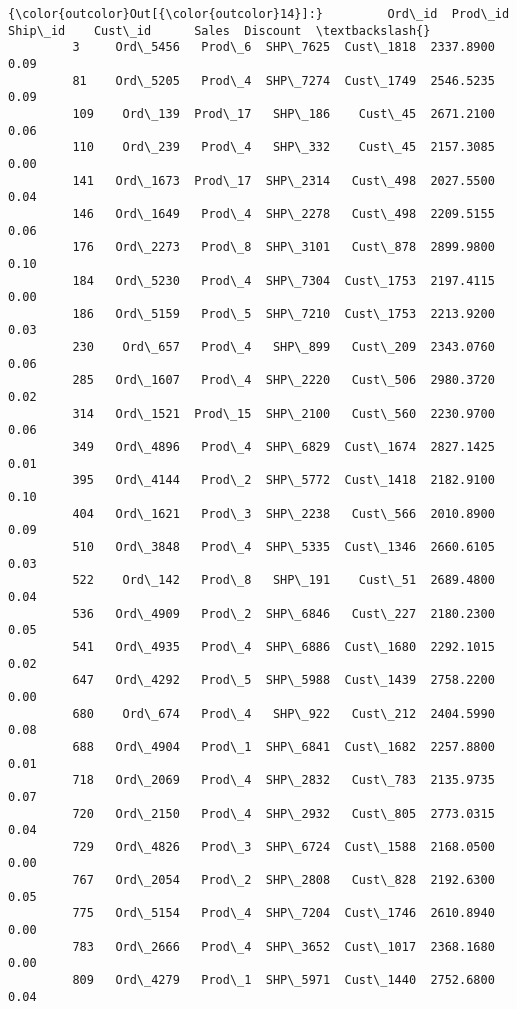 \documentclass[11pt]{article}
\begin{document}
\begin{Verbatim}[commandchars=\\\{\}]
{\color{outcolor}Out[{\color{outcolor}14}]:}         Ord\_id  Prod\_id   Ship\_id    Cust\_id      Sales  Discount  \textbackslash{}
         3     Ord\_5456   Prod\_6  SHP\_7625  Cust\_1818  2337.8900      0.09   
         81    Ord\_5205   Prod\_4  SHP\_7274  Cust\_1749  2546.5235      0.09   
         109    Ord\_139  Prod\_17   SHP\_186    Cust\_45  2671.2100      0.06   
         110    Ord\_239   Prod\_4   SHP\_332    Cust\_45  2157.3085      0.00   
         141   Ord\_1673  Prod\_17  SHP\_2314   Cust\_498  2027.5500      0.04   
         146   Ord\_1649   Prod\_4  SHP\_2278   Cust\_498  2209.5155      0.06   
         176   Ord\_2273   Prod\_8  SHP\_3101   Cust\_878  2899.9800      0.10   
         184   Ord\_5230   Prod\_4  SHP\_7304  Cust\_1753  2197.4115      0.00   
         186   Ord\_5159   Prod\_5  SHP\_7210  Cust\_1753  2213.9200      0.03   
         230    Ord\_657   Prod\_4   SHP\_899   Cust\_209  2343.0760      0.06   
         285   Ord\_1607   Prod\_4  SHP\_2220   Cust\_506  2980.3720      0.02   
         314   Ord\_1521  Prod\_15  SHP\_2100   Cust\_560  2230.9700      0.06   
         349   Ord\_4896   Prod\_4  SHP\_6829  Cust\_1674  2827.1425      0.01   
         395   Ord\_4144   Prod\_2  SHP\_5772  Cust\_1418  2182.9100      0.10   
         404   Ord\_1621   Prod\_3  SHP\_2238   Cust\_566  2010.8900      0.09   
         510   Ord\_3848   Prod\_4  SHP\_5335  Cust\_1346  2660.6105      0.03   
         522    Ord\_142   Prod\_8   SHP\_191    Cust\_51  2689.4800      0.04   
         536   Ord\_4909   Prod\_2  SHP\_6846   Cust\_227  2180.2300      0.05   
         541   Ord\_4935   Prod\_4  SHP\_6886  Cust\_1680  2292.1015      0.02   
         647   Ord\_4292   Prod\_5  SHP\_5988  Cust\_1439  2758.2200      0.00   
         680    Ord\_674   Prod\_4   SHP\_922   Cust\_212  2404.5990      0.08   
         688   Ord\_4904   Prod\_1  SHP\_6841  Cust\_1682  2257.8800      0.01   
         718   Ord\_2069   Prod\_4  SHP\_2832   Cust\_783  2135.9735      0.07   
         720   Ord\_2150   Prod\_4  SHP\_2932   Cust\_805  2773.0315      0.04   
         729   Ord\_4826   Prod\_3  SHP\_6724  Cust\_1588  2168.0500      0.00   
         767   Ord\_2054   Prod\_2  SHP\_2808   Cust\_828  2192.6300      0.05   
         775   Ord\_5154   Prod\_4  SHP\_7204  Cust\_1746  2610.8940      0.00   
         783   Ord\_2666   Prod\_4  SHP\_3652  Cust\_1017  2368.1680      0.00   
         809   Ord\_4279   Prod\_1  SHP\_5971  Cust\_1440  2752.6800      0.04   

\end{Verbatim}
\end{document}
